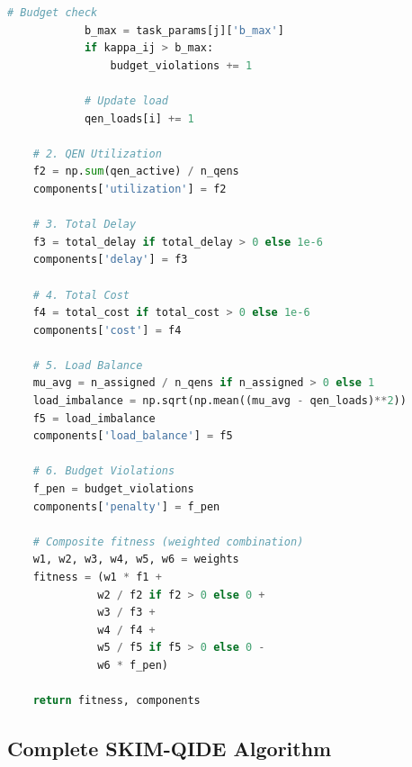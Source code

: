 \documentclass[12pt,a4paper]{article}
\begin{document}
\begin{lstlisting}[language=Python, caption=Fitness Evaluation]
            # Budget check
            b_max = task_params[j]['b_max']
            if kappa_ij > b_max:
                budget_violations += 1
            
            # Update load
            qen_loads[i] += 1
    
    # 2. QEN Utilization
    f2 = np.sum(qen_active) / n_qens
    components['utilization'] = f2
    
    # 3. Total Delay
    f3 = total_delay if total_delay > 0 else 1e-6
    components['delay'] = f3
    
    # 4. Total Cost
    f4 = total_cost if total_cost > 0 else 1e-6
    components['cost'] = f4
    
    # 5. Load Balance
    mu_avg = n_assigned / n_qens if n_assigned > 0 else 1
    load_imbalance = np.sqrt(np.mean((mu_avg - qen_loads)**2))
    f5 = load_imbalance
    components['load_balance'] = f5
    
    # 6. Budget Violations
    f_pen = budget_violations
    components['penalty'] = f_pen
    
    # Composite fitness (weighted combination)
    w1, w2, w3, w4, w5, w6 = weights
    fitness = (w1 * f1 + 
              w2 / f2 if f2 > 0 else 0 +
              w3 / f3 +
              w4 / f4 +
              w5 / f5 if f5 > 0 else 0 -
              w6 * f_pen)
    
    return fitness, components
\end{lstlisting}

\subsection{Complete SKIM-QIDE Algorithm}
\end{document}
